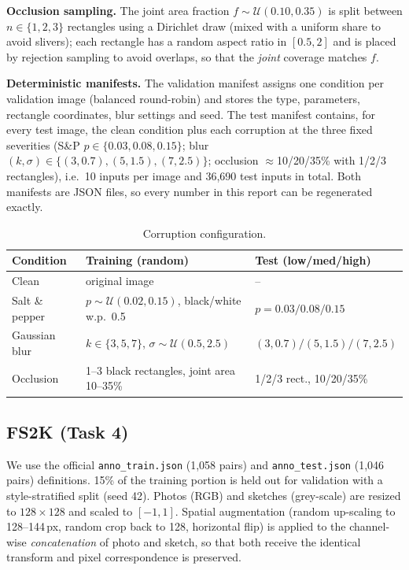 \documentclass[conference]{IEEEtran}
\begin{document}
\textbf{Occlusion sampling.} The joint area fraction $f\sim\mathcal{U}(0.10,0.35)$ is split between $n\in\{1,2,3\}$ rectangles using a Dirichlet draw (mixed with a uniform share to avoid slivers); each rectangle has a random aspect ratio in $[0.5,2]$ and is placed by rejection sampling to avoid overlaps, so that the \emph{joint} coverage matches $f$.

\textbf{Deterministic manifests.} The validation manifest assigns one condition per validation image (balanced round-robin) and stores the type, parameters, rectangle coordinates, blur settings and seed. The test manifest contains, for every test image, the clean condition plus each corruption at the three fixed severities (S\&P $p\in\{0.03,0.08,0.15\}$; blur $(k,\sigma)\in\{(3,0.7),(5,1.5),(7,2.5)\}$; occlusion $\approx$10/20/35\% with 1/2/3 rectangles), i.e.\ 10 inputs per image and 36,690 test inputs in total. Both manifests are JSON files, so every number in this report can be regenerated exactly.

\begin{table}[t]\centering
\caption{Corruption configuration.}\label{tab:corr}
\small
\begin{tabular}{p{1.5cm}p{3.1cm}p{2.6cm}}\toprule
Condition & Training (random) & Test (low/med/high)\\\midrule
Clean & original image & --\\
Salt \& pepper & $p\sim\mathcal{U}(0.02,0.15)$, black/white w.p.\ 0.5 & $p=0.03/0.08/0.15$\\
Gaussian blur & $k\in\{3,5,7\}$, $\sigma\sim\mathcal{U}(0.5,2.5)$ & $(3,0.7)/(5,1.5)/(7,2.5)$\\
Occlusion & 1--3 black rectangles, joint area 10--35\% & 1/2/3 rect., 10/20/35\%\\\bottomrule
\end{tabular}
\end{table}

\subsection{FS2K (Task 4)}
We use the official \texttt{anno\_train.json} (1,058 pairs) and \texttt{anno\_test.json} (1,046 pairs) definitions. 15\% of the training portion is held out for validation with a style-stratified split (seed 42). Photos (RGB) and sketches (grey-scale) are resized to $128{\times}128$ and scaled to $[-1,1]$. Spatial augmentation (random up-scaling to 128--144\,px, random crop back to 128, horizontal flip) is applied to the channel-wise \emph{concatenation} of photo and sketch, so that both receive the identical transform and pixel correspondence is preserved.
\end{document}
